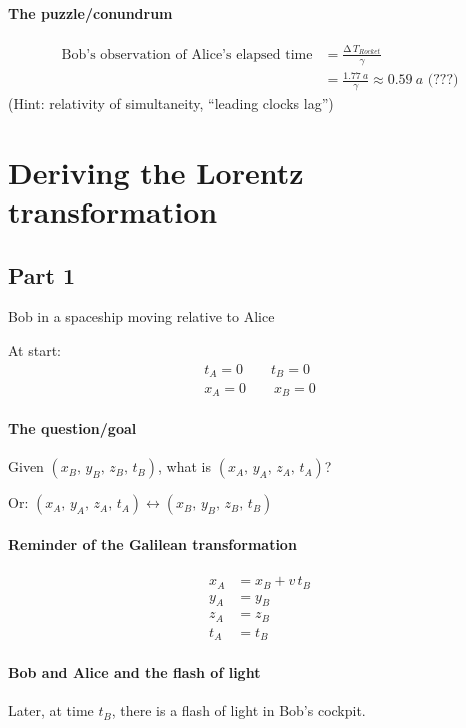 \documentclass[pagesize,headsepline,10pt,parskip=half]{scrreprt}
\newcommand*\mdelta[1]{\ensuremath{\mathrm{\Delta\,}#1}}
\begin{document}
      \paragraph{The puzzle/conundrum}
        \begin{align*}
          \text{Bob's observation of Alice's elapsed time} &= \frac{\mdelta{T}_{Rocket}}{\gamma}\\
            &= \frac{\SI{1.77}{a}}{\gamma} \approx \SI{0.59}{a} \text{ (???)}
        \end{align*}
        (Hint: relativity of simultaneity, ``leading clocks lag'')

    \section{Deriving the Lorentz transformation}
      \subsection{Part 1}
        Bob in a spaceship moving relative to Alice

        At start:
        \begin{align*}
          t_A = 0 \qquad t_B = 0\\
          x_A = 0 \qquad x_B = 0
        \end{align*}
        \paragraph{The question/goal}
          Given $(x_B, \, y_B, \, z_B, \, t_B)$,
          what is $(x_A, \, y_A, \, z_A, \, t_A)$?

          Or: $(x_A, \, y_A, \, z_A, \, t_A) \leftrightarrow (x_B, \, y_B, \, z_B, \, t_B)$

        \paragraph{Reminder of the Galilean transformation}
          \begin{align*}
            x_A &= x_B + v \, t_B\\
            y_A &= y_B\\
            z_A &= z_B\\
            t_A &= t_B
          \end{align*}

        \paragraph{Bob and Alice and the flash of light}
          Later, at time $t_B$, there is a flash of light in Bob's cockpit.
\end{document}
